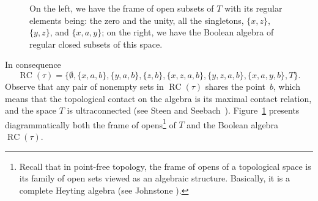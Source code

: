 \documentclass[a4paper,12pt]{amsart}
\numberwithin{equation}{section}
\theoremstyle{mytheoremstyle}
\DeclareMathOperator{\RCvtex}{RC}
\begin{document}
\begin{figure}
\centering
{}
\caption{On the left, we have the frame of open subsets of $T$ with its
regular elements being: the zero and the unity, all the singletons, $\{x,z\}$, $\{y,z\}$, and $\{x,a,y\}$; on the right, we have the Boolean algebra of regular
closed subsets of this space.}%
\label{fig:opens-of-T}
\end{figure}
\noindent In consequence
%
\begin{equation*}
\RCvtex (\tau )=\bigl\{\emptyset ,\{x,a,b\},\{y,a,b\},\{z,b\},\{x,z,a,b\},
\{y,z,a,b \},\{x,a,y,b\}, T\bigr\}.
\end{equation*}
%
Observe that any pair of nonempty sets in $\RCvtex (\tau )$ shares the point~$b$,
which means that the topological contact on the algebra is its maximal
contact relation, and the space $T$ is ultraconnected
(see Steen and Seebach~\cite[p.\,29]{Steen-Seebach-CT}). Figure~\ref{fig:opens-of-T} presents diagrammatically
both the frame of opens\footnote{Recall that in point-free
topology, the frame of opens of a topological space is its family of open
sets viewed as an algebraic structure. Basically, it is a complete Heyting
algebra (see Johnstone \cite{Johnstone-PPT}).} of $T$ and the Boolean algebra
$\RCvtex (\tau )$.
\end{document}
